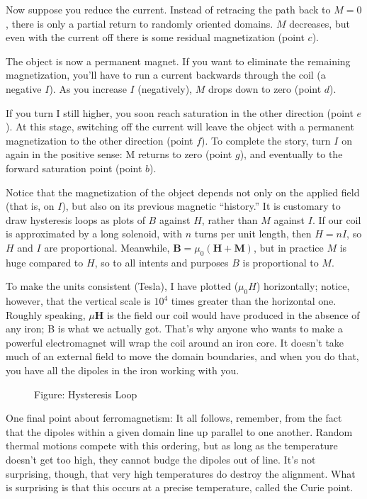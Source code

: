 \documentclass[../../../main.tex]{subfiles}
\begin{document}
Now suppose you reduce the current. Instead of retracing the path back to $M = 0$, there is only a partial return to randomly oriented domains. $M$ decreases, but even with the current off there is some residual magnetization (point $c$). 

The object is now a permanent magnet. If you want to eliminate the remaining magnetization, you’ll have to run a current backwards through the coil (a negative $I$). As you increase $I$ (negatively), $M$ drops down to zero (point $d$). 

If you turn I still higher, you soon reach saturation in the other direction (point $e$). At this stage, switching off the current will leave the object with a permanent magnetization to the other direction (point $f$). To complete the story, turn $I$ on again in the positive sense: M returns to zero (point $g$), and eventually to the forward saturation point (point $b$).

Notice that the magnetization of the object depends not only on the applied ﬁeld (that is, on $I$), but also on its previous magnetic “history.” It is customary to draw hysteresis loops as plots of $B$ against $H$, rather than $M$ against $I$. If our coil is approximated by a long solenoid, with $n$ turns per unit length, then $H = nI $, so $H$ and $I$ are proportional. Meanwhile, $\mathbf{B} = \mu_0(\mathbf{H} + \mathbf{M})$, but in practice $M$ is huge compared to $H$, so to all intents and purposes $B$ is proportional to $M$.

To make the units consistent (Tesla), I have plotted ($\mu_0 H$) horizontally; notice, however, that the vertical scale is $10^4$ times greater than the horizontal one. Roughly speaking, $\mu\mathbf{H}$ is the ﬁeld our coil would have produced in the absence of any iron; B is what we actually got. That’s why anyone who wants to make a powerful electromagnet will wrap the coil around an iron core. It doesn’t take much of an external ﬁeld to move the domain boundaries, and when you do that, you have all the dipoles in the iron working with you.

\begin{figure}
    \centering
    \caption*{Figure: Hysteresis Loop}
\end{figure}
One ﬁnal point about ferromagnetism: It all follows, remember, from the fact that the dipoles within a given domain line up parallel to one another. Random thermal motions compete with this ordering, but as long as the temperature doesn’t get too high, they cannot budge the dipoles out of line. It’s not surprising, though, that very high temperatures do destroy the alignment. What is surprising is that this occurs at a precise temperature, called the Curie point.
\end{document}
